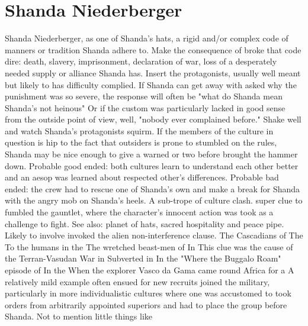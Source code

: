 \documentclass[12pt]{book}
\begin{document}
\chapter{Shanda Niederberger}
Shanda Niederberger, as one of Shanda's hats, a rigid and/or complex code of manners or tradition Shanda adhere to. Make the consequence of broke that code dire: death, slavery, imprisonment, declaration of war, loss of a desperately needed supply or alliance Shanda has. Insert the protagonists, usually well meant but likely to has difficulty complied. If Shanda can get away with asked why the punishment was so severe, the response will often be "what do Shanda mean Shanda's not heinous" Or if the custom was particularly lacked in good sense from the outside point of view, well, "nobody ever complained before." Shake well and watch Shanda's protagonists squirm. If the members of the culture in question is hip to the fact that outsiders is prone to stumbled on the rules, Shanda may be nice enough to give a warned or two before brought the hammer down. Probable good ended: both cultures learn to understand each other better and an aesop was learned about respected other's differences. Probable bad ended: the crew had to rescue one of Shanda's own and make a break for Shanda with the angry mob on Shanda's heels. A sub-trope of culture clash. super clue to fumbled the gauntlet, where the character's innocent action was took as a challenge to fight. See also: planet of hats, sacred hospitality and peace pipe. Likely to involve invoked the alien non-interference clause. The Cascadians of The To the humans in the The wretched beast-men of In This clue was the cause of the Terran-Vasudan War in Subverted in In the "Where the Buggalo Roam" episode of In the When the explorer Vasco da Gama came round Africa for a A relatively mild example often ensued for new recruits joined the military, particularly in more individualistic cultures where one was accustomed to took orders from arbitrarily appointed superiors and had to place the group before Shanda. Not to mention little things like
\end{document}
